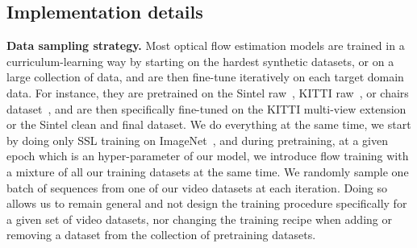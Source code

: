 
\renewcommand{\thesubsection}{\Alph{subsection}}
\newcommand\tab[1][5mm]{\hspace*{#1}}




\subsection{Implementation details} \label{sec:imp_details}

\noindent\textbf{Data sampling strategy.} Most optical flow estimation models are trained in a curriculum-learning way by starting on the hardest synthetic datasets, or on a large collection of data, and are then fine-tune iteratively on each target domain data. For instance, they are pretrained on the Sintel raw~\cite{butler2012sintel}, KITTI raw~\cite{geiger2013kitti}, or chairs dataset~\cite{yu2016flownet}, and are then specifically fine-tuned on the KITTI multi-view extension~\cite{menze2015kitti15} or the Sintel clean and final dataset. We do everything at the same time, we start by doing only SSL training on ImageNet~\cite{deng2009imagenet}, and during pretraining, at a given epoch which is an hyper-parameter of our model, we introduce flow training with a mixture of all our training datasets at the same time. We randomly sample one batch of sequences from one of our video datasets at each iteration. Doing so allows us to remain general and not design the training procedure specifically for a given set of video datasets, nor changing the training recipe when adding or removing a dataset from the collection of pretraining datasets.
\parspace

